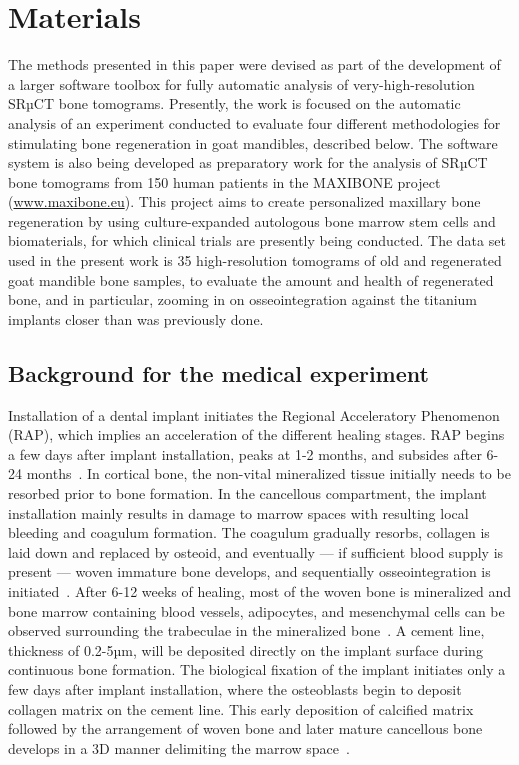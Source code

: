 \section{Materials}
\label{sec:materials}

The methods presented in this paper were devised as part of the development of
a larger software toolbox for fully automatic analysis of very-high-resolution
SRµCT bone tomograms. Presently, the work is focused on the automatic analysis
of an experiment conducted to evaluate four different methodologies for
stimulating bone regeneration in goat mandibles, described below. The software
system is also being developed as preparatory work for the analysis of SRµCT
bone tomograms from 150 human patients in the MAXIBONE project
(\url{www.maxibone.eu}). This project aims to create personalized maxillary
bone regeneration by using culture-expanded autologous bone marrow stem cells
and biomaterials, for which clinical trials are presently being conducted. The
data set used in the present work is 35 high-resolution tomograms of old and
regenerated goat mandible bone samples, to evaluate the amount and health of
regenerated bone, and in particular, zooming in on osseointegration against the
titanium implants closer than was previously done.

\subsection{Background for the medical experiment} Installation of a dental
implant initiates the Regional Acceleratory Phenomenon (RAP), which implies an
acceleration of the different healing stages. RAP begins a few days after
implant installation, peaks at 1-2 months, and subsides after 6-24
months~\cite{frost1989}. In cortical bone, the non-vital mineralized tissue
initially needs to be resorbed prior to bone formation. In the cancellous
compartment, the implant installation mainly results in damage to marrow spaces
with resulting local bleeding and coagulum formation. The coagulum gradually
resorbs, collagen is laid down and replaced by osteoid, and eventually --- if
sufficient blood supply is present --- woven immature bone develops, and
sequentially osseointegration is initiated~\cite{frost1989}. After 6-12 weeks
of healing, most of the woven bone is mineralized and bone marrow containing
blood vessels, adipocytes, and mesenchymal cells can be observed surrounding
the trabeculae in the mineralized bone~\cite{Berglundh2003, Abrahamsson2004}. A
cement line, thickness of 0.2-5µm, will be deposited directly on the implant
surface during continuous bone formation. The biological fixation of the
implant initiates only a few days after implant installation, where the
osteoblasts begin to deposit collagen matrix on the cement line. This early
deposition of calcified matrix followed by the arrangement of woven bone and
later mature cancellous bone develops in a 3D manner delimiting the marrow
space~\cite{Franchi2004}.

